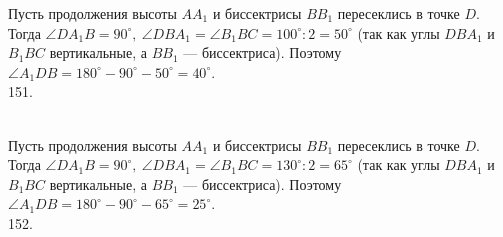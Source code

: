 \documentclass[12pt]{article}
\begin{document}
Пусть продолжения высоты $AA_1$ и биссектрисы $BB_1$ пересеклись в точке $D.$ Тогда $\angle DA_1B=90^\circ,\ \angle DBA_1=\angle B_1BC=100^\circ:2=50^\circ$ (так как углы $DBA_1$ и $B_1BC$ вертикальные, а $BB_1$ --- биссектриса). Поэтому $\angle A_1DB=180^\circ-90^\circ-50^\circ=40^\circ.$\\
151.  \begin{figure}[ht!]
\end{figure}\\
Пусть продолжения высоты $AA_1$ и биссектрисы $BB_1$ пересеклись в точке $D.$ Тогда $\angle DA_1B=90^\circ,\ \angle DBA_1=\angle B_1BC=130^\circ:2=65^\circ$ (так как углы $DBA_1$ и $B_1BC$ вертикальные, а $BB_1$ --- биссектриса). Поэтому $\angle A_1DB=180^\circ-90^\circ-65^\circ=25^\circ.$\\
152. \begin{figure}[ht!]
\end{figure}\\
\end{document}
